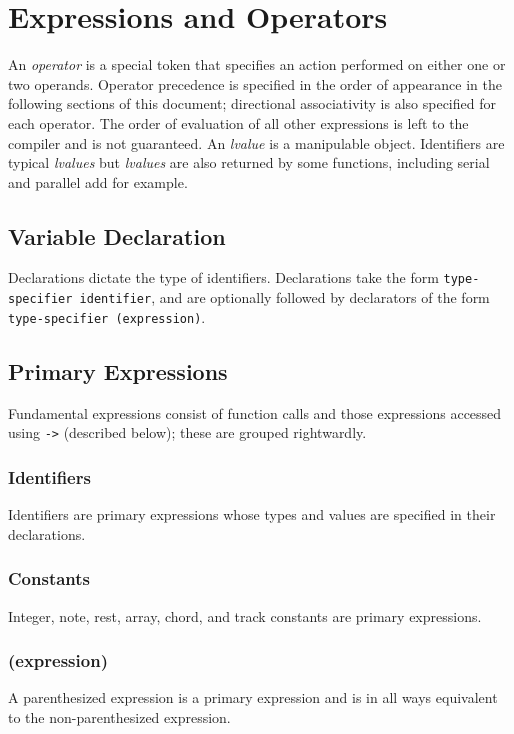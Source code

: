 \documentclass[letterpaper]{article}
\begin{document}
\section{Expressions and Operators}
An \textit{operator} is a special token that specifies an action performed on either one or two operands. Operator precedence is specified in the order of appearance in the following sections of this document; directional associativity is also specified for each operator. The order of evaluation of all other expressions is left to the compiler and is not guaranteed. An \textit{lvalue} is a manipulable object. Identifiers are typical \textit{lvalues} but \textit{lvalues} are also returned by some functions, including serial and parallel add for example. 

\subsection{Variable Declaration}
Declarations dictate the type of identifiers. Declarations take the form
\texttt{type-specifier identifier}, and are optionally followed by declarators of the form \texttt{type-specifier (expression)}.

\subsection{Primary Expressions}
Fundamental expressions consist of function calls and those expressions accessed using \texttt{-\textgreater} (described below); these are grouped rightwardly.


\subsubsection{Identifiers} 
Identifiers are primary expressions whose types and values are specified in their declarations.

\subsubsection{Constants}
Integer, note, rest, array, chord, and track constants are primary expressions.

\subsubsection{(expression)}
A parenthesized expression is a primary expression and is in all ways equivalent to the non-parenthesized expression.
\end{document}
